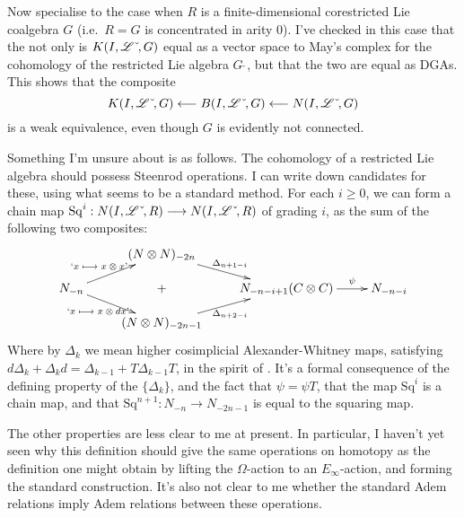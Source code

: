 \documentclass[10pt]{article}
\newcommand{\Sq}{\mathrm{Sq}}
\newcommand{\dual}{\,\check{\,}}
\newcommand{\LieOperad}{\scrL}
\newcommand{\dualLieOperad}{\LieOperad\dual}
\begin{document}
\begin{Corestricted Lie coalgebras Executive Summary}
Now specialise to the case when $R$ is a finite-dimensional corestricted Lie coalgebra $G$ (i.e.\ $R=G$ is concentrated in arity 0). I've checked in this case that the not only is $K(I,\dualLieOperad,G)$ equal as a vector space to May's complex for the cohomology of the restricted Lie algebra $G\dual$, but that the two are equal as DGAs. This shows that the composite
\[K(I,\dualLieOperad,G) \from B(I,\dualLieOperad,G) \from N(I,\dualLieOperad,G)\]
is a weak equivalence, even though $G$ is evidently not connected.

Something I'm unsure about is as follows. The cohomology of a restricted Lie algebra should possess Steenrod operations. I can write down candidates for these, using what seems to be a standard method.
For each $i\geq0$, we can form a chain map $\Sq^{i}:N(I,\dualLieOperad,R)\to N(I,\dualLieOperad,R)$ of grading $i$, as the sum of the following two composites:
\[\xymatrix@R=4mm{
&%
(N\otimes N)_{-2n}
\ar[dr]^-{\Delta_{n+1-i}}
&%
&%
\\%
N_{-n}
\ar[ur]^-{\textup{`$x\mapsto x\otimes x$'}}
\ar[dr]_-{\textup{`$x\mapsto x\otimes dx$'}}&%
+&%
N_{-n-i+1}(C\otimes C)
\ar[r]^-{\psi}
&%
N_{-n-i}\\%
&%
(N\otimes N)_{-2n-1}
\ar[ur]_-{\Delta_{n+2-i}}
&%
&%
}\]
Where by $\Delta_k$ we mean higher cosimplicial Alexander-Whitney maps, satisfying $d\Delta_k+\Delta_k d=\Delta_{k-1}+T\Delta_{k-1}T$, in the spirit of  \cite{DwyerHigherDividedSquares.pdf}.
It's a formal consequence of the defining property of the $\{\Delta_k\}$, and the fact that $\psi=\psi T$, that the map $\Sq^i$ is a chain map, and that $\Sq^{n+1}:N_{-n}\to N_{-2n-1}$ is equal to the squaring map.

The other properties are less clear to me at present. In particular, I haven't yet seen why this definition should give the same operations on homotopy as the definition one might obtain by lifting the $\Omega$-action to an $E_{\infty}$-action, and forming the standard construction. It's also not clear to me whether the standard Adem relations imply Adem relations between these operations.
\end{Corestricted Lie coalgebras Executive Summary}
\end{document}
